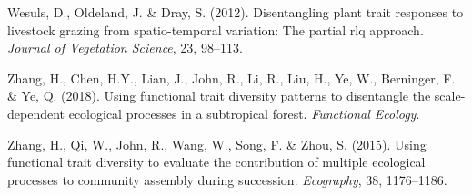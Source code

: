 \documentclass[]{article}
\begin{document}
\hypertarget{ref-wesuls2012partialRLQ}{}
Wesuls, D., Oldeland, J. \& Dray, S. (2012). Disentangling plant trait
responses to livestock grazing from spatio-temporal variation: The
partial rlq approach. \emph{Journal of Vegetation Science}, 23, 98--113.

\hypertarget{ref-zhang2018}{}
Zhang, H., Chen, H.Y., Lian, J., John, R., Li, R., Liu, H., Ye, W.,
Berninger, F. \& Ye, Q. (2018). Using functional trait diversity
patterns to disentangle the scale-dependent ecological processes in a
subtropical forest. \emph{Functional Ecology}.

\hypertarget{ref-zhang2015}{}
Zhang, H., Qi, W., John, R., Wang, W., Song, F. \& Zhou, S. (2015).
Using functional trait diversity to evaluate the contribution of
multiple ecological processes to community assembly during succession.
\emph{Ecography}, 38, 1176--1186.
\end{document}
